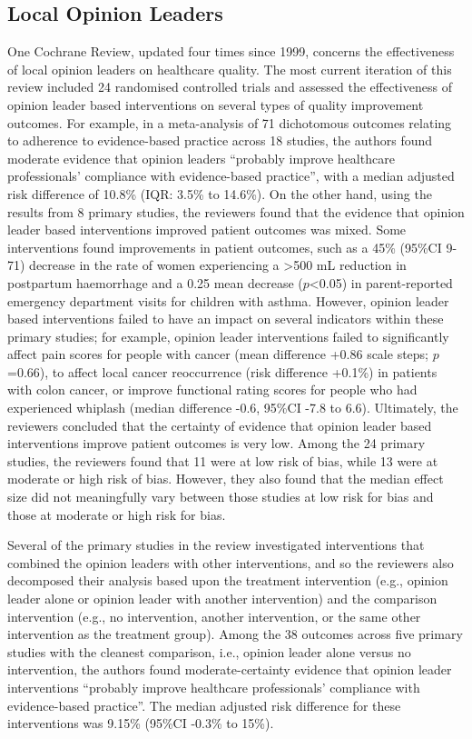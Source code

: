 \documentclass[12pt]{article}
\begin{document}
\subsection{Local Opinion Leaders}
One Cochrane Review, updated four times since 1999, concerns the effectiveness of local opinion leaders on healthcare quality. The most current iteration of this review \citep{flodgrenLocalOpinionLeaders2019} included 24 randomised controlled trials and assessed the effectiveness of opinion leader based interventions on several types of quality improvement outcomes. For example, in a meta-analysis of 71 dichotomous outcomes relating to adherence to evidence-based practice across 18 studies, the authors found moderate evidence that opinion leaders ``probably improve healthcare professionals' compliance with evidence-based practice'', with a median adjusted risk difference of 10.8\% (IQR: 3.5\% to 14.6\%). On the other hand, using the results from 8 primary studies, the reviewers found that the evidence that opinion leader based interventions improved patient outcomes was mixed. Some interventions found improvements in patient outcomes, such as a 45\% (95\%CI 9-71) decrease in the rate of women experiencing a >500 mL reduction in postpartum haemorrhage and a 0.25 mean decrease ($p$<0.05) in parent-reported emergency department visits for children with asthma. However, opinion leader based interventions failed to have an impact on several indicators within these primary studies; for example, opinion leader interventions failed to significantly affect pain scores for people with cancer (mean difference +0.86 scale steps; $p$=0.66), to affect local cancer reoccurrence (risk difference +0.1\%) in patients with colon cancer, or improve functional rating scores for people who had experienced whiplash (median difference -0.6, 95\%CI -7.8 to 6.6). Ultimately, the reviewers concluded that the certainty of evidence that opinion leader based interventions improve patient outcomes is very low. Among the 24 primary studies, the reviewers found that 11 were at low risk of bias, while 13 were at moderate or high risk of bias. However, they also found that the median effect size did not meaningfully vary between those studies at low risk for bias and those at moderate or high risk for bias.

Several of the primary studies in the review investigated interventions that combined the opinion leaders with other interventions, and so the reviewers also decomposed their analysis based upon the treatment intervention (e.g., opinion leader alone or opinion leader with another intervention) and the comparison intervention (e.g., no intervention, another intervention, or the same other intervention as the treatment group). Among the 38 outcomes across five primary studies with the cleanest comparison, i.e., opinion leader alone versus no intervention, the authors found moderate-certainty evidence that opinion leader interventions ``probably improve healthcare professionals' compliance with evidence-based practice''. The median adjusted risk difference for these interventions was 9.15\% (95\%CI -0.3\% to 15\%).
\end{document}

